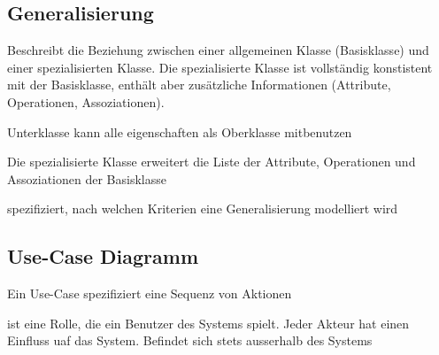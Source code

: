 \subsection{Generalisierung}
Beschreibt die Beziehung zwischen einer allgemeinen Klasse (Basisklasse) und
einer spezialisierten Klasse. Die spezialisierte Klasse ist vollständig
konstistent mit der Basisklasse, enthält aber zusätzliche Informationen
(Attribute, Operationen, Assoziationen).
	\begin{description}[style=multiline,leftmargin=3.5cm,rightmargin=2cm, topsep=0pt]
		\item[Vererbung] Unterklasse kann alle eigenschaften als Oberklasse
		mitbenutzen
		\item[Einfachvererbung]
		\item[Mehrfachvererbung]
		\item[Generalisierung] Die spezialisierte Klasse erweitert die Liste der
		Attribute, Operationen und Assoziationen der Basisklasse
		\item[Generalisierungsmenge] spezifiziert, nach welchen Kriterien eine
		Generalisierung modelliert wird
	\end{description}
	
\subsection{Use-Case Diagramm}
	Ein Use-Case spezifiziert eine Sequenz von Aktionen
	\begin{description}[style=multiline,leftmargin=3.5cm,rightmargin=2cm, topsep=0pt]
		\item[Akteur] ist eine Rolle, die ein Benutzer des Systems spielt. Jeder
		Akteur hat einen Einfluss uaf das System. Befindet sich stets ausserhalb des Systems\\
	\end{description}

